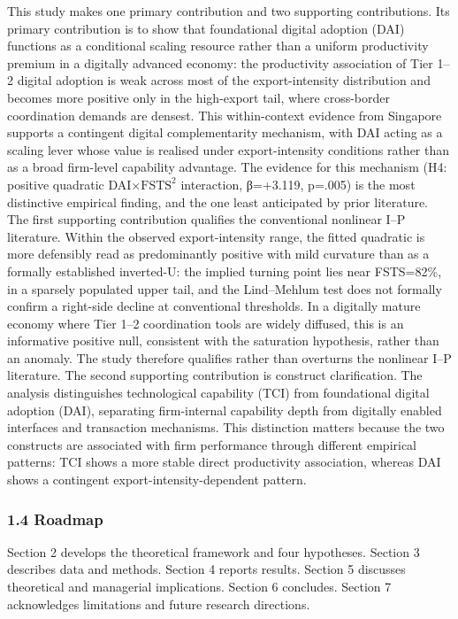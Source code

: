 \documentclass[12pt,a4paper]{article}
\begin{document}
This study makes one primary contribution and two supporting
contributions. Its primary contribution is to show that foundational
digital adoption (DAI) functions as a conditional scaling resource
rather than a uniform productivity premium in a digitally advanced
economy: the productivity association of Tier 1--2 digital adoption is
weak across most of the export-intensity distribution and becomes more
positive only in the high-export tail, where cross-border coordination
demands are densest. This within-context evidence from Singapore
supports a contingent digital complementarity mechanism, with DAI acting
as a scaling lever whose value is realised under export-intensity
conditions rather than as a broad firm-level capability advantage. The
evidence for this mechanism (H4: positive quadratic
DAI×\(\mathrm{FSTS}^2\) interaction, β=+3.119, p=.005) is the most
distinctive empirical finding, and the one least anticipated by prior
literature. The first supporting contribution qualifies the conventional
nonlinear I--P literature. Within the observed export-intensity range,
the fitted quadratic is more defensibly read as predominantly positive
with mild curvature than as a formally established inverted-U: the
implied turning point lies near FSTS=82\%, in a sparsely populated upper
tail, and the Lind--Mehlum test does not formally confirm a right-side
decline at conventional thresholds. In a digitally mature economy where
Tier 1--2 coordination tools are widely diffused, this is an informative
positive null, consistent with the saturation hypothesis, rather than an
anomaly. The study therefore qualifies rather than overturns the
nonlinear I--P literature. The second supporting contribution is
construct clarification. The analysis distinguishes technological
capability (TCI) from foundational digital adoption (DAI), separating
firm-internal capability depth from digitally enabled interfaces and
transaction mechanisms. This distinction matters because the two
constructs are associated with firm performance through different
empirical patterns: TCI shows a more stable direct productivity
association, whereas DAI shows a contingent export-intensity-dependent
pattern.

\hypertarget{14-roadmap}{%
\subsubsection{1.4 Roadmap}\label{14-roadmap}}

Section 2 develops the theoretical framework and four hypotheses.
Section 3 describes data and methods. Section 4 reports results. Section
5 discusses theoretical and managerial implications. Section 6
concludes. Section 7 acknowledges limitations and future research
directions.
\end{document}
